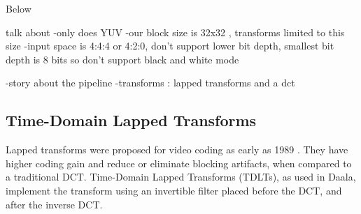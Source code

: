 \documentclass[conference, 10pt]{IEEEtran}
\begin{document}
Below

%
%
%


%

 talk about
 -only does YUV
 -our block size is 32x32 , transforms limited to this size
 -input space is 4:4:4 or 4:2:0, don't support lower bit depth, smallest bit depth is 8 bits so don't support black and white mode
 
 -story about the pipeline
 -transforms : lapped transforms and a dct
 






\subsection{Time-Domain Lapped Transforms}
\label{sec:tdlt}

Lapped transforms were proposed for video coding as early as 1989 \cite{journals/tsp/MalvarS89}.
They have higher coding gain and reduce or eliminate blocking artifacts, when
 compared to a traditional DCT.
Time-Domain Lapped Transforms (TDLTs), as used in Daala, implement the transform
 using an invertible filter placed before the DCT, and after the inverse DCT.
\end{document}
